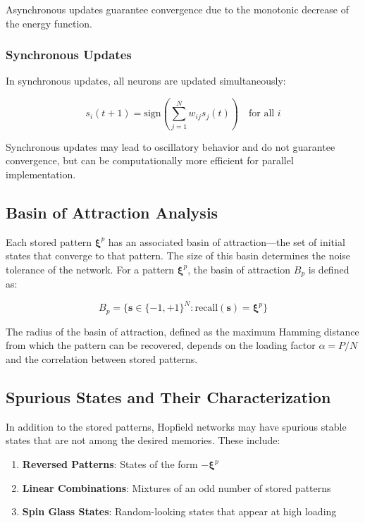 \documentclass[11pt,a4paper]{article}
\begin{document}
Asynchronous updates guarantee convergence due to the monotonic decrease of the energy function.

\subsubsection{Synchronous Updates}

In synchronous updates, all neurons are updated simultaneously:

\begin{equation}
s_i(t+1) = \text{sign}\left(\sum_{j=1}^{N} w_{ij} s_j(t)\right) \quad \text{for all } i
\label{eq:sync_update}
\end{equation}

Synchronous updates may lead to oscillatory behavior and do not guarantee convergence, but can be computationally more efficient for parallel implementation.

\subsection{Basin of Attraction Analysis}

Each stored pattern $\boldsymbol{\xi}^p$ has an associated basin of attraction—the set of initial states that converge to that pattern. The size of this basin determines the noise tolerance of the network. For a pattern $\boldsymbol{\xi}^p$, the basin of attraction $B_p$ is defined as:

\begin{equation}
B_p = \{\mathbf{s} \in \{-1, +1\}^N : \text{recall}(\mathbf{s}) = \boldsymbol{\xi}^p\}
\end{equation}

The radius of the basin of attraction, defined as the maximum Hamming distance from which the pattern can be recovered, depends on the loading factor $\alpha = P/N$ and the correlation between stored patterns.

\subsection{Spurious States and Their Characterization}

In addition to the stored patterns, Hopfield networks may have spurious stable states that are not among the desired memories. These include:

\begin{enumerate}
    \item \textbf{Reversed Patterns}: States of the form $-\boldsymbol{\xi}^p$
    \item \textbf{Linear Combinations}: Mixtures of an odd number of stored patterns
    \item \textbf{Spin Glass States}: Random-looking states that appear at high loading
\end{enumerate}
\end{document}

